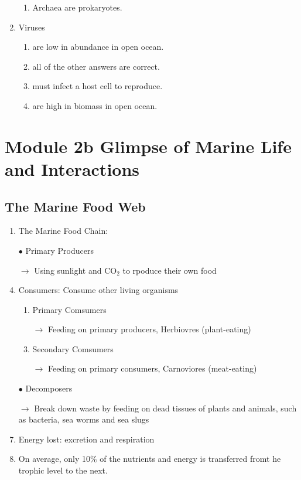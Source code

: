 \documentclass{report}
\begin{document}
\begin{enumerate}
\begin{enumerate}
        \item   Archaea are prokaryotes. 
    \end{enumerate}
    \item Viruses
    \begin{enumerate}
        \item   are low in abundance in open ocean. 
        \item   all of the other answers are correct. 
        \item    must infect a host cell to reproduce. 
        \item   are high in biomass in open ocean. 
    \end{enumerate}
\end{enumerate}


\chapter{Module 2b Glimpse of Marine Life and Interactions}


\section{The Marine Food Web}
\begin{enumerate}
    \item The Marine Food Chain:
    \item [$\bullet$]Primary Producers
    \item [$\rightarrow$]Using sunlight and CO$_{2}$ to rpoduce their own food
    \item Consumers: Consume other living organisms
    \begin{enumerate} 
        \item Primary Comsumers
        \item [$\rightarrow$]Feeding on primary producers, Herbiovres (plant-eating)
        \item Secondary Comsumers
        \item [$\rightarrow$]Feeding on primary consumers, Carnoviores (meat-eating) 
    \end{enumerate} 

    \item [$\bullet$]Decomposers
    \item [$\rightarrow$]Break down waste by feeding on dead tissues of plants and animals, such as bacteria, sea worms and sea slugs
    \item Energy lost: excretion and respiration
    \item On average, only 10$\%$ of the nutrients and energy is transferred fromt he trophic level to the next.
\end{enumerate}
\end{document}
